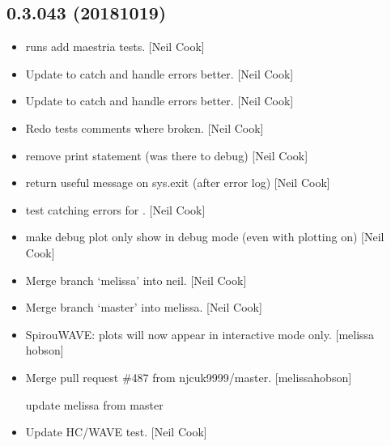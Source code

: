\documentclass[a4paper,10pt,english]{report}
\begin{document}
\subsection{0.3.043 (2018\sphinxhyphen{}10\sphinxhyphen{}19)}
\label{\detokenize{misc/changelog:id307}}\begin{itemize}
\item {} 
 runs \sphinxhyphen{} add maestria tests. {[}Neil Cook{]}

\item {} 
Update  to catch and handle errors better. {[}Neil
Cook{]}

\item {} 
Update  to catch and handle errors better. {[}Neil
Cook{]}

\item {} 
Redo tests \sphinxhyphen{} comments where broken. {[}Neil Cook{]}

\item {} 
 \sphinxhyphen{} remove print statement (was there to debug) {[}Neil
Cook{]}

\item {} 
 \sphinxhyphen{} return useful message on sys.exit (after error log)
{[}Neil Cook{]}

\item {} 
 \sphinxhyphen{} test catching errors for . {[}Neil
Cook{]}

\item {} 
 \sphinxhyphen{} make debug plot only show in debug mode (even with
plotting on) {[}Neil Cook{]}

\item {} 
Merge branch ‘melissa’ into neil. {[}Neil Cook{]}

\item {} 
Merge branch ‘master’ into melissa. {[}Neil Cook{]}

\item {} 
SpirouWAVE: plots will now appear in interactive mode only. {[}melissa\sphinxhyphen{}
hobson{]}

\item {} 
Merge pull request \#487 from njcuk9999/master. {[}melissa\sphinxhyphen{}hobson{]}

update melissa from master

\item {} 
Update HC/WAVE test. {[}Neil Cook{]}


\end{itemize}
\end{document}
